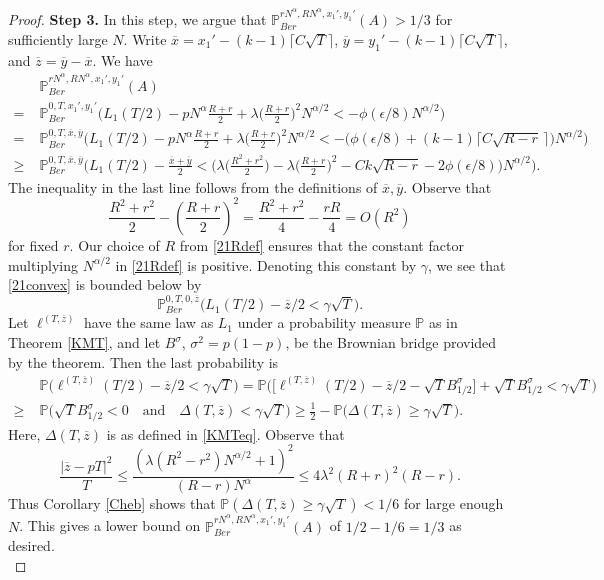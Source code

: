 \begin{proof}
		\noindent\textbf{Step 3.} In this step, we argue that $\mathbb{P}^{rN^\alpha, RN^\alpha,x_1',y_1'}_{Ber} (A) > 1/3$ for sufficiently large $N$. Write $\overline{x} = x_1' - (k-1)\lceil C\sqrt{T}\rceil$, $\overline{y} = y_1' - (k-1)\lceil C\sqrt{T}\rceil$, and $\overline{z} = \overline{y}-\overline{x}$. We have
		\begin{align}
		& \mathbb{P}^{rN^\alpha, RN^\alpha,x_1',y_1'}_{Ber} (A)\nonumber\\
		= \; &\mathbb{P}^{0,T,x_1',y_1'}_{Ber} \Big(L_1(T/2) - pN^\alpha \frac{R+r}{2} + \lambda\Big(\frac{R+r}{2}\Big)^2 N^{\alpha/2} < -\phi(\epsilon/8)N^{\alpha/2}\Big)\nonumber\\
		= \; & \mathbb{P}^{0,T,\overline{x},\overline{y}}_{Ber}\Big(L_1(T/2) - pN^\alpha\frac{R+r}{2} + \lambda\Big(\frac{R+r}{2}\Big)^2 N^{\alpha/2} < -\big(\phi(\epsilon/8) + (k-1)\lceil C\sqrt{R-r}\,\rceil\big)N^{\alpha/2}\Big)\nonumber\\
		\geq \; & \mathbb{P}^{0,T,\overline{x},\overline{y}}_{Ber}\Big(L_1(T/2) - \frac{\overline{x} + \overline{y}}{2} < \Big( \lambda\Big(\frac{R^2+r^2}{2}\Big) - \lambda\Big(\frac{R+r}{2}\Big)^2 - Ck\sqrt{R-r} - 2\phi(\epsilon/8)\Big)N^{\alpha/2}\Big). \label{21convex}
		\end{align}
		The inequality in the last line follows from the definitions of $\overline{x},\overline{y}$. Observe that
		\[
		\frac{R^2+r^2}{2} - \left(\frac{R+r}{2}\right)^2 = \frac{R^2 + r^2}{4} - \frac{rR}{4} = O(R^2)
		\]
		for fixed $r$. Our choice of $R$ from \eqref{21Rdef} ensures that the constant factor multiplying $N^{\alpha/2}$ in \eqref{21Rdef} is positive. Denoting this constant by $\gamma$, we see that \eqref{21convex} is bounded below by
		\[
		\mathbb{P}^{0,T,0,\overline{z}}_{Ber}\Big(L_1(T/2) - \overline{z}/2 < \gamma\sqrt{T}\Big).
		\]
		Let $\ell^{(T,\overline{z})}$ have the same law as $L_1$ under a probability measure $\mathbb{P}$ as in Theorem \ref{KMT}, and let $B^\sigma$, $\sigma^2 = p(1-p)$, be the Brownian bridge provided by the theorem. Then the last probability is
		\begin{align*}
		& \mathbb{P}\Big( \ell^{(T,\overline{z})}(T/2) - \overline{z}/2 < \gamma\sqrt{T}\Big) = \mathbb{P}\Big(\Big[\ell^{(T,\overline{z})}(T/2) - \overline{z}/2 - \sqrt{T}B^\sigma_{1/2}\Big] + \sqrt{T}B^\sigma_{1/2} < \gamma\sqrt{T}\Big) \\
		\geq \; & \mathbb{P}\Big(\sqrt{T}B^\sigma_{1/2} < 0\quad\mathrm{and}\quad \Delta(T,\overline{z}) < \gamma\sqrt{T}\Big) \geq \frac{1}{2} - \mathbb{P}\Big(\Delta(T,\overline{z}) \geq \gamma\sqrt{T}\Big).
		\end{align*}
		Here, $\Delta(T,\overline{z})$ is as defined in \eqref{KMTeq}. Observe that
		\begin{equation}\label{21zpT}
		\frac{|\overline{z} - pT|^2}{T} \leq \frac{(\lambda(R^2-r^2) N^{\alpha/2} + 1)^2}{(R-r)N^\alpha} \leq 4\lambda^2(R+r)^2(R-r).
		\end{equation}
		Thus Corollary \ref{Cheb} shows that $\mathbb{P}(\Delta(T,\overline{z})\geq \gamma\sqrt{T})<1/6$ for large enough $N$. This gives a lower bound on $\mathbb{P}^{rN^\alpha, RN^\alpha,x_1',y_1'}_{Ber} (A)$ of $1/2 - 1/6 = 1/3$ as desired.\\
		

\end{proof}

